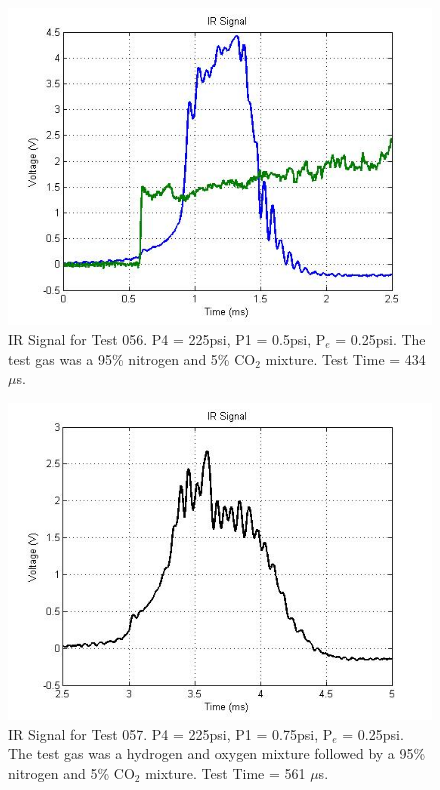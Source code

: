 \begin{figure}
\centering
\includegraphics[width = \textwidth]{Figures/CO2-2.jpg}
\caption[IR Signal for Test 046]{IR Signal for Test 056. P4 = 225psi, P1 = 0.5psi, P$_e$ = 0.25psi. The test gas was a 95\% nitrogen and 5\% CO$_2$ mixture. Test Time = 434 $\mu$s.}
\label{fig:IRTrace}
\end{figure}

\begin{figure}
\centering
\includegraphics[width = \textwidth]{Figures/H2.jpg}
\caption[IR Signal for Test 046]{IR Signal for Test 057. P4 = 225psi, P1 = 0.75psi, P$_e$ = 0.25psi. The test gas was a hydrogen and oxygen mixture followed by a 95\% nitrogen and 5\% CO$_2$ mixture. Test Time = 561 $\mu$s.}
\label{fig:IRTrace2}
\end{figure}

